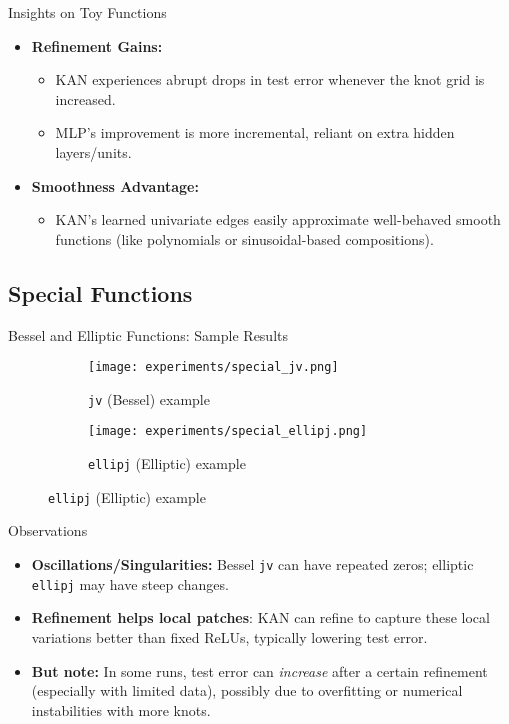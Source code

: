 \documentclass{beamer}
\begin{document}
\begin{frame}{Insights on Toy Functions}
    \begin{itemize}
        \item \textbf{Refinement Gains:}
              \begin{itemize}
                  \item KAN experiences abrupt drops in test error whenever the knot grid is increased.
                  \item MLP’s improvement is more incremental, reliant on extra hidden layers/units.
              \end{itemize}
        \item \textbf{Smoothness Advantage:}
              \begin{itemize}
                  \item KAN’s learned univariate edges easily approximate well-behaved smooth functions (like polynomials or sinusoidal-based compositions).
              \end{itemize}
    \end{itemize}
\end{frame}

\subsection{Special Functions}
\begin{frame}{Bessel and Elliptic Functions: Sample Results}
    \begin{figure}[h]
        \centering
        \begin{subfigure}{0.45\textwidth}
            \texttt{[image: experiments/special\_jv.png]}
            \caption{\texttt{jv} (Bessel) example}
        \end{subfigure}
        \quad
        \begin{subfigure}{0.45\textwidth}
            \texttt{[image: experiments/special\_ellipj.png]}
            \caption{\texttt{ellipj} (Elliptic) example}
        \end{subfigure}
    \end{figure}
\end{frame}

\begin{frame}{Observations}
  \begin{itemize}
    \item \textbf{Oscillations/Singularities:} Bessel \texttt{jv} can have repeated zeros; elliptic \texttt{ellipj} may have steep changes.
    \item \textbf{Refinement helps local patches}: KAN can refine to capture these local variations better than fixed ReLUs, typically lowering test error.
    \item \textbf{But note:} In some runs, test error can \emph{increase} after a certain refinement (especially with limited data), possibly due to overfitting or numerical instabilities with more knots.
  \end{itemize}
  
\end{frame}
\end{document}
